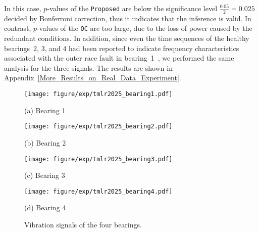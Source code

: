 In this case, $p$-values of the \texttt{Proposed} are below the significance level $\frac{0.05}{2} = 0.025$ decided by Bonferroni correction,
thus it indicates that the inference is valid. 
In contrast, $p$-values of the \texttt{OC} are too large, 
due to the loss of power caused by the redundant conditions. 
In addition, since even the time sequences of the healthy bearings~2, 3, and 4 had been reported to indicate frequency characteristics associated with the outer race fault in bearing~1~\citep{gousseau2016analysis}, 
we performed the same analysis for the three signals.
The results are shown in Appendix~\ref{More_Results_on_Real_Data_Experiment}.

\begin{figure}[t]
  \centering
  \begin{minipage}[t]{0.24\hsize}
      \centering
      \texttt{[image: figure/exp/tmlr2025\_bearing1.pdf]}
      \captionsetup{justification=centering}
      \caption*{(a) Bearing 1}
  \end{minipage}
  \begin{minipage}[t]{0.24\hsize}
    \centering
    \texttt{[image: figure/exp/tmlr2025\_bearing2.pdf]}
    \captionsetup{justification=centering}
    \caption*{(b) Bearing 2}
  \end{minipage}
  \begin{minipage}[t]{0.24\hsize}
    \centering
    \texttt{[image: figure/exp/tmlr2025\_bearing3.pdf]}
    \captionsetup{justification=centering}
    \caption*{(c) Bearing 3}
  \end{minipage}
  \begin{minipage}[t]{0.24\hsize}
    \centering
    \texttt{[image: figure/exp/tmlr2025\_bearing4.pdf]}
    \captionsetup{justification=centering}
    \caption*{(d) Bearing 4}
  \end{minipage}
  \caption{Vibration signals of the four bearings.}
  \label{fig_bearing_signals}
\end{figure}

